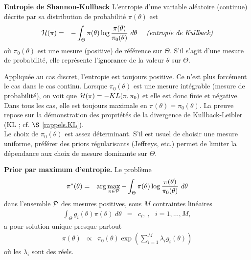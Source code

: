 \begin{definition}{\bf Entropie de Shannon-Kullback}
L'\textcolor{black}{entropie} d'une variable aléatoire (continue) décrite par sa distribution de probabilité $\pi(\theta)$ est
\begin{eqnarray*}
{\cal{H}}(\pi) & = & - \int_{\Theta} \pi(\theta) \log\frac{\pi(\theta)}{\pi_0(\theta)} \ d\theta  \ \ \ \ \text{\it (\textcolor{black}{entropie de Kullback})}
\end{eqnarray*}  
où $\pi_0(\theta)$ est une mesure (positive) de référence sur $\Theta$. S'il s'agit d'une mesure de probabilité, elle représente l'\textcolor{black}{ignorance} de la valeur $\theta$ sur $\Theta$.
\end{definition}

Appliquée au cas discret, l'entropie est toujours positive. Ce n'est plus forcément le cas dans le cas continu. Lorsque $\pi_0(\theta)$ est une mesure intégrable (mesure de probabilité), on voit que ${\cal{H}}(\pi)=-KL(\pi,\pi_0)$ et elle est donc finie et négative. Dans tous les cas, elle est toujours maximale en $\pi(\theta)=\pi_0(\theta)$. La preuve repose sur la démonstration des propriétés de la divergence de Kullback-Leibler (KL ; cf. $\S$ \ref{rappels.KL}). \\

Le choix de $\pi_0(\theta)$ est assez déterminant. S'il est usuel de choisir une mesure uniforme, préférer des priors régularisants (Jeffreys, etc.) permet de limiter la dépendance aux choix de mesure dominante sur $\Theta$. \\


\begin{theorem}{\bf Prior par maximum d'entropie.}
Le problème
\begin{eqnarray*}
\textcolor{black}{\pi^*(\theta)} & = & \textcolor{black}{\arg\max\limits_{\pi\in{\cal{P}}} - \int_{\Theta} \pi(\theta) \log\frac{\pi(\theta)}{\pi_0(\theta)} \ d\theta} \label{maxent}
\end{eqnarray*}
dans l'ensemble ${\cal{P}}$ des mesures positives, sous $M$ contraintes  linéaires
\begin{eqnarray*}
\int_{\Theta} g_i(\theta) \pi(\theta) \ d\theta & = & c_i, \ ,\ \ \ i=1,\ldots,M,
\end{eqnarray*}
a pour solution unique presque partout
\begin{eqnarray*}
\pi(\theta) & \propto & \pi_0(\theta) \exp\left(\sum\limits_{i=1}^M \lambda_i g_i(\theta)\right)
\end{eqnarray*}
où les $\lambda_i$ sont des réels. 
\end{theorem}


